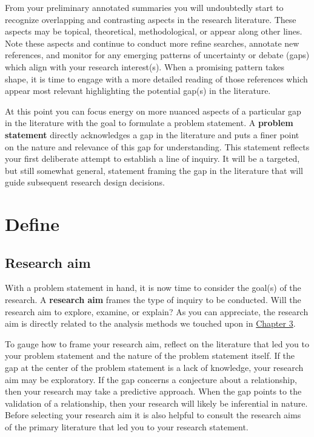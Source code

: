 \documentclass[
  letterpaper,
]{latex/krantz}
\theoremstyle{definition}
\theoremstyle{remark}
\begin{document}
From your preliminary annotated summaries you will undoubtedly start to
recognize overlapping and contrasting aspects in the research
literature. These aspects may be topical, theoretical, methodological,
or appear along other lines. Note these aspects and continue to conduct
more refine searches, annotate new references, and monitor for any
emerging patterns of uncertainty or debate (gaps) which align with your
research interest(s). When a promising pattern takes shape, it is time
to engage with a more detailed reading of those references which appear
most relevant highlighting the potential gap(s) in the literature.

At this point you can focus energy on more nuanced aspects of a
particular gap in the literature with the goal to formulate a problem
statement. A \textbf{problem statement} directly acknowledges a gap in
the literature and puts a finer point on the nature and relevance of
this gap for understanding. This statement reflects your first
deliberate attempt to establish a line of inquiry. It will be a
targeted, but still somewhat general, statement framing the gap in the
literature that will guide subsequent research design decisions.

\section{Define}\label{sec-fr-define}

\subsection{Research aim}\label{sec-fr-aim}

With a problem statement in hand, it is now time to consider the goal(s)
of the research. A \textbf{research aim} frames the type of inquiry to
be conducted. Will the research aim to explore, examine, or explain? As
you can appreciate, the research aim is directly related to the analysis
methods we touched upon in \hyperref[sec-approaching-analysis]{Chapter
3}.

To gauge how to frame your research aim, reflect on the literature that
led you to your problem statement and the nature of the problem
statement itself. If the gap at the center of the problem statement is a
lack of knowledge, your research aim may be exploratory. If the gap
concerns a conjecture about a relationship, then your research may take
a predictive approach. When the gap points to the validation of a
relationship, then your research will likely be inferential in nature.
Before selecting your research aim it is also helpful to consult the
research aims of the primary literature that led you to your research
statement.
\end{document}
